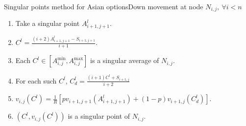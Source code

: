 \documentclass[utf8,t,xcolor=svgnames]{beamer}
\begin{document}
\begin{frame}{Singular points method for Asian options}{Down movement at node $ N_{i,j}, \  \forall i < n $}
	\begin{minipage}[t]{0.6\linewidth}
		\begin{enumerate}
			\item Take a singular point $ A_{i+1,j+1}^l $.
			\item $ C^l = \frac{ ( i+2) A_{i+1,j+1}^l - S_{i+1,j+1} }{ i+1 } $.
			\item Each $ C^l \in \left[ A_{i,j}^{\min}, A_{i,j}^{\max} \right] $ is a singular average of $ N_{i,j} $.
			\item For each such $ C^l $, $ C^l_d = \frac{(i+1) C^l + S_{i+1,j}}{i+2}  $
			\item $ v_{i,j}( C^l ) = \frac{1}{R} \left[ p v_{i+1,j+1} \left( A_{i+1,j+1}^l \right) + (1 - p) v_{i+1,j} \left( C^l_d \right) \right] $.
			\item $ \left( C^l, v_{i,j}( C^l ) \right) $ is a singular point of $ N_{i,j} $.
		\end{enumerate}
	\end{minipage}
	\begin{minipage}[t]{0.3\linewidth}
		\begin{figure}
		\end{figure}
	\end{minipage}
\end{frame}
\end{document}
